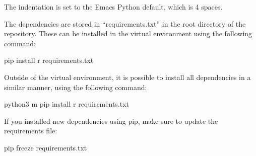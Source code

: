 \documentclass[letterpaper,10pt,english]{sphinxmanual}
\begin{document}

\begin{fulllineitems}
\label{\detokenize{development:Indentation}}
\sphinxAtStartPar
The indentation is set to the Emacs Python default, which is 4 spaces.

\end{fulllineitems}


\begin{fulllineitems}
\label{\detokenize{development:Dependencies}}
\sphinxAtStartPar
The dependencies are stored in “requirements.txt” in the root directory of the repository. These can be installed in the virtual environment using the following command:

\begin{sphinxVerbatim}[commandchars=\\\{\}]
pip install \PYGZhy{}r requirements.txt
\end{sphinxVerbatim}

\sphinxAtStartPar
Outside of the virtual environment, it is possible to install all dependencies in a similar manner, using the following command:

\begin{sphinxVerbatim}[commandchars=\\\{\}]
python3 \PYGZhy{}m pip install \PYGZhy{}r requirements.txt
\end{sphinxVerbatim}

\sphinxAtStartPar
If you installed new dependencies using pip, make sure to update the requirements file:

\begin{sphinxVerbatim}[commandchars=\\\{\}]
pip freeze \PYGZgt{} requirements.txt
\end{sphinxVerbatim}

\end{fulllineitems}
\end{document}
